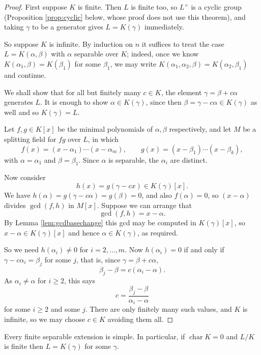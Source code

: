 \documentclass[a4paper]{scrartcl}
\newcommand{\charr}{\operatorname{char}}
\begin{document}
\begin{proof}
	First suppose $K$ is finite. Then $L$ is finite too, so $L^\times$ is a cyclic group (Proposition \ref{prop:cyclic} below, whose proof does not use this theorem), and taking $\gamma$ to be a generator gives $L = K(\gamma)$ immediately.

	So suppose $K$ is infinite. By induction on $n$ it suffices to treat the case $L = K(\alpha, \beta)$ with $\alpha$ separable over $K$; indeed, once we know $K(\alpha_1, \beta) = K(\beta_1)$ for some $\beta_1$, we may write $K(\alpha_1,\alpha_2,\beta) = K(\alpha_2, \beta_1)$ and continue.

	We shall show that for all but finitely many $c \in K$, the element $\gamma = \beta + c\alpha$ generates $L$. It is enough to show $\alpha \in K(\gamma)$, since then $\beta = \gamma - c\alpha \in K(\gamma)$ as well and so $K(\gamma) = L$.

	Let $f, g \in K[x]$ be the minimal polynomials of $\alpha, \beta$ respectively, and let $M$ be a splitting field for $fg$ over $L$, in which
	$$f(x) = (x-\alpha_1)\cdots(x-\alpha_m), \qquad g(x) = (x-\beta_1)\cdots(x-\beta_k),$$
	with $\alpha = \alpha_1$ and $\beta = \beta_1$. Since $\alpha$ is separable, the $\alpha_i$ are distinct.

	Now consider
	$$h(x) = g(\gamma - cx) \in K(\gamma)[x].$$
	We have $h(\alpha) = g(\gamma - c\alpha) = g(\beta) = 0$, and also $f(\alpha) = 0$, so $(x-\alpha)$ divides $\gcd(f,h)$ in $M[x]$. Suppose we can arrange that
	$$\gcd(f,h) = x - \alpha.$$
	By Lemma \ref{lem:gcdbasechange} this gcd may be computed in $K(\gamma)[x]$, so $x - \alpha \in K(\gamma)[x]$ and hence $\alpha \in K(\gamma)$, as required.

	So we need $h(\alpha_i) \neq 0$ for $i = 2, \dots, m$. Now $h(\alpha_i) = 0$ if and only if $\gamma - c\alpha_i = \beta_j$ for some $j$, that is, since $\gamma = \beta + c\alpha$,
	$$\beta_j - \beta = c(\alpha_i - \alpha).$$
	As $\alpha_i \neq \alpha$ for $i \geq 2$, this says
	$$c = \frac{\beta_j - \beta}{\alpha_i - \alpha}$$
	for some $i \geq 2$ and some $j$. There are only finitely many such values, and $K$ is infinite, so we may choose $c \in K$ avoiding them all.
\end{proof}

\begin{corollary}
	Every finite separable extension is simple. In particular, if $\charr K = 0$ and $L/K$ is finite then $L = K(\gamma)$ for some $\gamma$.
\end{corollary}
\end{document}
